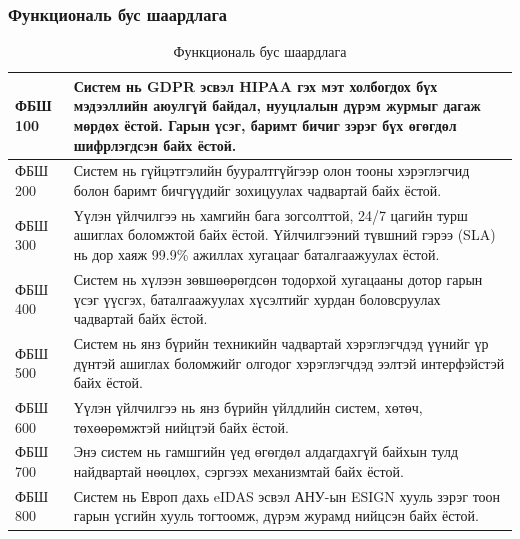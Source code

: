 \subsubsection{Функциональ бус шаардлага}
\begin{table}
	\centering
	\caption{Функциональ бус шаардлага}
	\begin{tabular}{ |p{2cm}|p{13cm}| }
		\hline
		ФБШ 100 & Систем нь GDPR эсвэл HIPAA гэх мэт холбогдох бүх мэдээллийн аюулгүй байдал, нууцлалын дүрэм журмыг дагаж мөрдөх ёстой. Гарын үсэг, баримт бичиг зэрэг бүх өгөгдөл шифрлэгдсэн байх ёстой. \\ \hline
		ФБШ 200 & Систем нь гүйцэтгэлийн бууралтгүйгээр олон тооны хэрэглэгчид болон баримт бичгүүдийг зохицуулах чадвартай байх ёстой.                                                                     \\ \hline
		ФБШ 300 & Үүлэн үйлчилгээ нь хамгийн бага зогсолттой, 24/7 цагийн турш ашиглах боломжтой байх ёстой. Үйлчилгээний түвшний гэрээ (SLA) нь дор хаяж 99.9\% ажиллах хугацааг баталгаажуулах ёстой.     \\ \hline
		ФБШ 400 & Систем нь хүлээн зөвшөөрөгдсөн тодорхой хугацааны дотор гарын үсэг үүсгэх, баталгаажуулах хүсэлтийг хурдан боловсруулах чадвартай байх ёстой.                                             \\ \hline
		ФБШ 500 & Систем нь янз бүрийн техникийн чадвартай хэрэглэгчдэд үүнийг үр дүнтэй ашиглах боломжийг олгодог хэрэглэгчдэд ээлтэй интерфэйстэй байх ёстой.                                             \\ \hline
		ФБШ 600 & Үүлэн үйлчилгээ нь янз бүрийн үйлдлийн систем, хөтөч, төхөөрөмжтэй нийцтэй байх ёстой.                                                                                                    \\  \hline
		ФБШ 700 & Энэ систем нь гамшгийн үед өгөгдөл алдагдахгүй байхын тулд найдвартай нөөцлөх, сэргээх механизмтай байх ёстой.                                                                            \\ \hline
		ФБШ 800 & Систем нь Европ дахь eIDAS эсвэл АНУ-ын ESIGN хууль зэрэг тоон гарын үсгийн хууль тогтоомж, дүрэм журамд нийцсэн байх ёстой.                                                              \\ \hline
	\end{tabular}
\end{table}
\newpage
